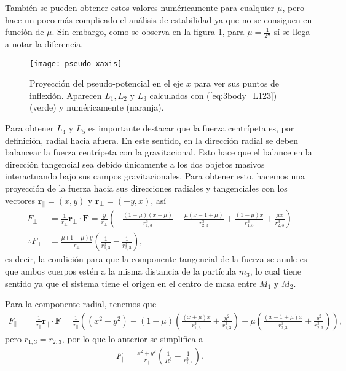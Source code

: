 También se pueden obtener estos valores numéricamente para cualquier $\mu$, pero hace un poco más complicado el análisis de estabilidad ya que no se consiguen en función de $\mu$. Sin embargo, como se observa en la figura \ref{fig:3body_pseudo_xaxis}, para $\mu = \frac{1}{27}$ sí se llega a notar la diferencia.

\begin{figure}[h!]
 \centering
 \texttt{[image: pseudo\_xaxis]}
 \caption{Proyección del pseudo-potencial en el eje $x$ para ver sus puntos de inflexión. Aparecen $L_1, L_2$ y $L_3$ calculados con (\ref{eq:3body_L123}) (verde) y numéricamente (naranja).}
 \label{fig:3body_pseudo_xaxis}
\end{figure}

Para obtener $L_4$ y $L_5$ es importante destacar que la fuerza centrípeta es, por definición, radial hacia afuera. En este sentido, en la dirección radial se deben balancear la fuerza centrípeta con la gravitacional. Esto hace que el balance en la dirección tangencial sea debido únicamente a los dos objetos masivos interactuando bajo sus campos gravitacionales. Para obtener esto, hacemos una proyección de la fuerza hacia sus direcciones radiales y tangenciales con los vectores $\mathbf{r}_{\parallel} = (x,y)$ y $\mathbf{r}_{\bot} = (-y,x)$, así
\begin{align*}
 F_{\bot} &= \frac{1}{r_{\bot}} \mathbf{r}_{\bot} \cdot \mathbf{F} = \frac{y}{r_{\bot}} \left( - \frac{(1-\mu)(x + \mu)}{ r_{1,3}^3 } - \frac{\mu(x - 1 +\mu )}{ r_{2,3}^3 } + \frac{(1-\mu)x}{ r_{1,3}^3 } + \frac{\mu x}{ r_{2,3}^3 } \right) \\
 \therefore F_{\bot} &= \frac{ \mu(1-\mu) y}{r_{\bot}} \left( \frac{1}{r_{1,3}^3} - \frac{1}{r_{2,3}^3} \right),
\end{align*}
es decir, la condición para que la componente tangencial de la fuerza se anule es que ambos cuerpos estén a la misma distancia de la partícula $m_3$, lo cual tiene sentido ya que el sistema tiene el origen en el centro de masa entre $M_1$ y $M_2$. 

Para la componente radial, tenemos que
\begin{align*}
 F_{\parallel} &= \frac{1}{r_{\parallel}} \mathbf{r}_{\parallel} \cdot \mathbf{F} = \frac{1}{r_\parallel} \left( (x^2 + y^2) -  (1-\mu) \left( \frac{(x+ \mu)x}{r_{1,3}^3} + \frac{y^2}{r_{1,3}^3} \right) - \mu \left( \frac{(x - 1 +\mu) x}{r_{2,3}^3} + \frac{y^2}{r_{2,3}^3} \right) \right),
\end{align*}
pero $r_{1,3} = r_{2,3}$, por lo que lo anterior se simplifica a 
\begin{align*}
 F_{\parallel} = \frac{x^2 + y^2}{r_\parallel} \left( \frac{1}{R^3} - \frac{1}{r_{1,3}^3} \right).
\end{align*}

